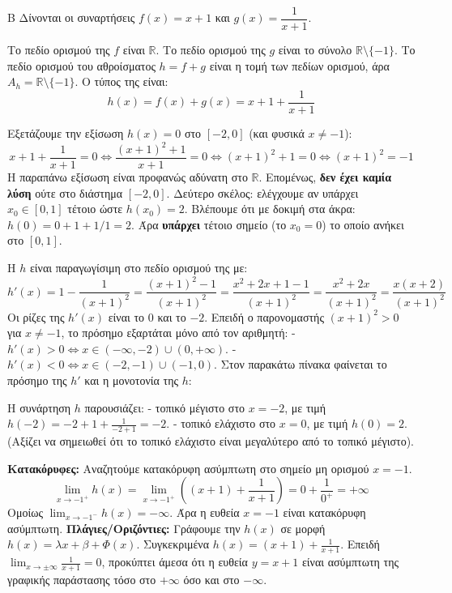 \begin{thema}{Β}
Δίνονται οι συναρτήσεις $f(x) = x+1$ και $g(x) = \dfrac{1}{x+1}$.
\begin{erwthma}
\item Το πεδίο ορισμού της $f$ είναι $\mathbb{R}$. Το πεδίο ορισμού της $g$ είναι το σύνολο $\mathbb{R} \setminus \{-1\}$.
Το πεδίο ορισμού του αθροίσματος $h = f + g$ είναι η τομή των πεδίων ορισμού, άρα $A_h = \mathbb{R} \setminus \{-1\}$.
Ο τύπος της είναι:
\[ h(x) = f(x) + g(x) = x + 1 + \frac{1}{x+1} \]

\item Εξετάζουμε την εξίσωση $h(x) = 0$ στο $[-2, 0]$ (και φυσικά $x \ne -1$):
\[ x + 1 + \frac{1}{x+1} = 0 \Leftrightarrow \frac{(x+1)^2 + 1}{x+1} = 0 \Leftrightarrow (x+1)^2 + 1 = 0 \Leftrightarrow (x+1)^2 = -1 \]
H παραπάνω εξίσωση είναι προφανώς αδύνατη στο $\mathbb{R}$. Επομένως, \textbf{δεν έχει καμία λύση} ούτε στο διάστημα $[-2, 0]$.
Δεύτερο σκέλος: ελέγχουμε αν υπάρχει $x_0 \in [0, 1]$ τέτοιο ώστε $h(x_0)=2$.
Βλέπουμε ότι με δοκιμή στα άκρα:
$h(0) = 0 + 1 + 1/1 = 2$.
Άρα \textbf{υπάρχει} τέτοιο σημείο (το $x_0=0$) το οποίο ανήκει στο $[0, 1]$.

\item Η $h$ είναι παραγωγίσιμη στο πεδίο ορισμού της με:
\[ h'(x) = 1 - \frac{1}{(x+1)^2} = \frac{(x+1)^2 - 1}{(x+1)^2} = \frac{x^2+2x+1-1}{(x+1)^2} = \frac{x^2+2x}{(x+1)^2} = \frac{x(x+2)}{(x+1)^2} \]
Οι ρίζες της $h'(x)$ είναι το $0$ και το $-2$. 
Επειδή ο παρονομαστής $(x+1)^2 > 0$ για $x \ne -1$, το πρόσημο εξαρτάται μόνο από τον αριθμητή:
- $h'(x) > 0 \Leftrightarrow x \in (-\infty, -2) \cup (0, +\infty)$.
- $h'(x) < 0 \Leftrightarrow x \in (-2, -1) \cup (-1, 0)$.
Στον παρακάτω πίνακα φαίνεται το πρόσημο της $h'$ και η μονοτονία της $h$:
\begin{center}
\end{center}
Η συνάρτηση $h$ παρουσιάζει:
- τοπικό μέγιστο στο $x = -2$, με τιμή $h(-2) = -2 + 1 + \frac{1}{-2+1} = -2$.
- τοπικό ελάχιστο στο $x = 0$, με τιμή $h(0) = 2$.
(Αξίζει να σημειωθεί ότι το τοπικό ελάχιστο είναι μεγαλύτερο από το τοπικό μέγιστο).

\item \textbf{Κατακόρυφες:} Αναζητούμε κατακόρυφη ασύμπτωτη στο σημείο μη ορισμού $x = -1$.
\[ \lim_{x\to-1^+} h(x) = \lim_{x\to-1^+} \left( (x+1) + \frac{1}{x+1} \right) = 0 + \frac{1}{0^+} = +\infty \]
Ομοίως $\lim_{x\to-1^-} h(x) = -\infty$. Άρα η ευθεία $x = -1$ είναι κατακόρυφη ασύμπτωτη.
\textbf{Πλάγιες/Οριζόντιες:} Γράφουμε την $h(x)$ σε μορφή $h(x) = \lambda x + \beta + \Phi(x)$.
Συγκεκριμένα $h(x) = (x+1) + \frac{1}{x+1}$.
Επειδή $\lim_{x\to\pm\infty} \frac{1}{x+1} = 0$, προκύπτει άμεσα ότι η ευθεία $y = x+1$ είναι ασύμπτωτη της γραφικής παράστασης τόσο στο $+\infty$ όσο και στο $-\infty$.
\end{erwthma}
\end{thema}

